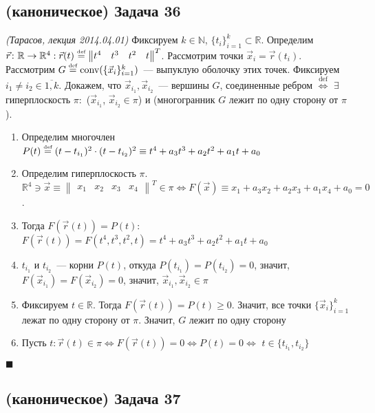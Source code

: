 \documentclass[a4paper]{article}
\def\conv{{\mbox{conv}}}
\def\eqdef{\overset{\mbox{\tiny def}}{=}}
\newcommand{\NN}{\mathbb{N}}
\newcommand{\RR}{\mathbb{R}}
\begin{document}
\subsection*{(каноническое) Задача 36}
{\em (Тарасов, лекция 2014.04.01)}\newline
Фиксируем $k\in\NN$, $\{t_i\}_{i=1}^k\subset\RR$. Определим $\vec{r}\colon \RR\to \RR^4: \vec{r}(t)\eqdef \begin{Vmatrix}
t^4 & t^3 & t^2 & t
\end{Vmatrix}^T
$. Рассмотрим точки $\vec{x}_i=\vec{r}(t_i)$. Рассмотрим $G\eqdef\conv(\{\vec{x}_i\}_{i=1}^k)$~--- выпуклую оболочку этих точек. Фиксируем $i_1\neq i_2\in\overline{1,k}$. Докажем, что $\vec{x}_{i_1},\vec{x}_{i_2}$~--- вершины $G$, соединенные ребром $\overset{\mbox{def}}{\Leftrightarrow}$ $\exists$ гиперплоскость $\pi\colon$ ($\vec{x}_{i_1}$, $\vec{x}_{i_2}\in\pi$) и (многогранник $G$ лежит по одну сторону от $\pi$).\begin{enumerate}
\item Определим многочлен $P(t)\eqdef (t-t_{i_1})^2\cdot(t-t_{i_2})^2\equiv t^4+a_3t^3+a_2t^2+a_1t+a_0$
\item Определим гиперплоскость $\pi$. $\RR^4\ni\vec{x}\equiv \begin{Vmatrix}
x_1 & x_2 & x_3 & x_4\end{Vmatrix}^T\in\pi\Leftrightarrow F(\vec{x})\equiv x_1+a_3x_2+a_2x_3+a_1x_4+a_0=0$.
\item Тогда $F(\vec{r}(t))=P(t)$: $F(\vec{r}(t))=F(t^4,t^3,t^2,t)=t^4+a_3t^3+a_2t^2+a_1t+a_0$
\item $t_{i_1}$ и $t_{i_2}$~--- корни $P(t)$, откуда $P(t_{i_1})=P(t_{i_2})=0$, значит, $F(\vec{x}_{i_1})=F(\vec{x}_{i_2})=0$, значит, $\vec{x}_{i_1},\vec{x}_{i_2}\in\pi$
\item Фиксируем $t\in\RR$. Тогда $F(\vec{r}(t))=P(t)\geqslant 0$. Значит, все точки $\{\vec{x}_i\}_{i=1}^k$ лежат по одну сторону от $\pi$. Значит, $G$ лежит по одну сторону 
\item Пусть $t\colon \vec{r}(t)\in\pi\Leftrightarrow F(\vec{r}(t))=0\Leftrightarrow P(t)=0\Leftrightarrow$ $t\in\{t_{i_1},t_{i_2}\}$
\end{enumerate}
$\blacksquare$
\subsection*{(каноническое) Задача 37}
\end{document}
